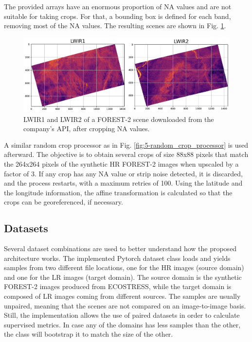     The provided arrays have an enormous proportion of NA values and are not suitable for taking crops.
    For that, a bounding box is defined for each band, removing most of the NA values. 
    The resulting scenes are shown in Fig. \ref{fig:4-forest-bounding-box}.

    \begin{figure}[H]
        \centering
        \includegraphics[width=\linewidth]{Includes/4-forest2-cropped-bands.pdf}
        \caption{LWIR1 and LWIR2 of a FOREST-2 scene downloaded from the company's API, after cropping NA values.}
        \label{fig:4-forest-bounding-box}
    \end{figure}

    A similar random crop processor as in Fig. \ref{fig:5-random_crop_processor} is used afterward. 
    The objective is to obtain several crops of size 88x88 pixels that match the 264x264 pixels of the synthetic HR FOREST-2 images when upscaled by a factor of 3.
    If any crop has any NA value or strip noise detected, it is discarded, and the process restarts, with a maximum retries of 100.
    Using the latitude and the longitude information, the affine transformation is calculated so that the crops can be georeferenced, if necessary.
    
\subsection{Datasets}

Several dataset combinations are used to better understand how the proposed architecture works. 
The implemented Pytorch dataset class loads and yields samples from two different file locations, one for the HR images (source domain) and one for the LR images (target domain). 
The source domain is the synthetic FOREST-2 images produced from ECOSTRESS, while the target domain is composed of LR images coming from different sources.
The samples are usually unpaired, meaning that the scenes are not compared on an image-to-image basis. Still, the implementation allows the use of paired datasets in order to calculate supervised metrics. 
In case any of the domains has less samples than the other, the class will bootstrap it to match the size of the other.




